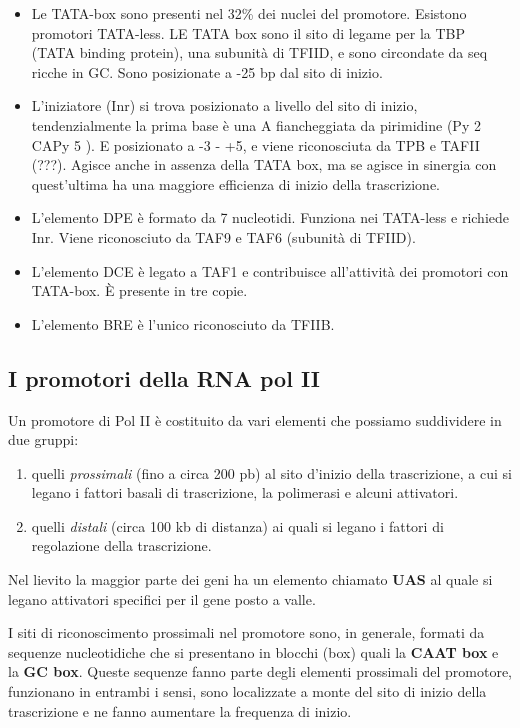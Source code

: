 \documentclass[11pt]{book}
\begin{document}
\begin{itemize}
\item
  Le TATA-box sono presenti nel 32\% dei nuclei del promotore. Esistono
  promotori TATA-less. LE TATA box sono il sito di legame per la TBP
  (TATA binding protein), una subunità di TFIID, e sono circondate da
  seq ricche in GC. Sono posizionate a -25 bp dal sito di inizio.
\item
  L'iniziatore (Inr) si trova posizionato a livello del sito di inizio,
  tendenzialmente la prima base è una A fiancheggiata da pirimidine (Py
  2 CAPy 5 ). E posizionato a -3 - +5, e viene riconosciuta da TPB e
  TAFII (???). Agisce anche in assenza della TATA box, ma se agisce in
  sinergia con quest'ultima ha una maggiore efficienza di inizio della
  trascrizione.
\item
  L'elemento DPE è formato da 7 nucleotidi. Funziona nei TATA-less e
  richiede Inr. Viene riconosciuto da TAF9 e TAF6 (subunità di TFIID).
\item
  L'elemento DCE è legato a TAF1 e contribuisce all'attività dei
  promotori con TATA-box. È presente in tre copie.
\item
  L'elemento BRE è l'unico riconosciuto da TFIIB.
\end{itemize}

\subsection{I promotori della RNA pol
II}\label{i-promotori-della-rna-pol-ii}

Un promotore di Pol II è costituito da vari elementi che possiamo
suddividere in due gruppi:

\begin{enumerate}
\def\labelenumi{\arabic{enumi}.}
\itemsep1pt\parskip0pt
\item
  quelli \emph{prossimali} (fino a circa 200 pb) al sito d'inizio della
  trascrizione, a cui si legano i fattori basali di trascrizione, la
  polimerasi e alcuni attivatori.
\item
  quelli \emph{distali} (circa 100 kb di distanza) ai quali si legano i
  fattori di regolazione della trascrizione.
\end{enumerate}

Nel lievito la maggior parte dei geni ha un elemento chiamato
\textbf{UAS} al quale si legano attivatori specifici per il gene posto a
valle.

I siti di riconoscimento prossimali nel promotore sono, in generale,
formati da sequenze nucleotidiche che si presentano in blocchi (box)
quali la \textbf{CAAT box} e la \textbf{GC box}. Queste sequenze fanno
parte degli elementi prossimali del promotore, funzionano in entrambi i
sensi, sono localizzate a monte del sito di inizio della trascrizione e
ne fanno aumentare la frequenza di inizio.
\end{document}
